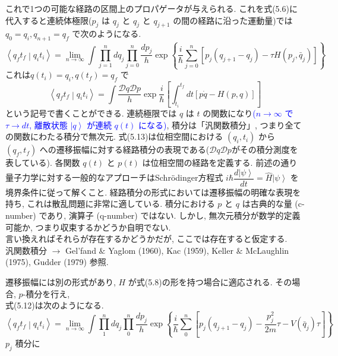 \documentclass{jsarticle}
\newcommand{\ket}[1]{\left|#1\right\rangle}
\newcommand{\braket}[2]{\left\langle #1\middle|#2\right\rangle}
\begin{document}
これで1つの可能な経路の区間上のプロパゲータが与えられる. これを式(5.6)に代入すると連続体極限($p_{j}$ は $q_{j}$ と $q_{j}$ と $q_{j+1}$ の間の経路に沿った運動量)では $q_{0} = q_{i}, q_{n+1} = q_{f}$ で次のようになる.
\begin{equation*}
    \braket{q_{f}t_{f}}{q_{i}t_{i}} = \lim_{n \rightarrow \infty} \int \prod_{j=1}^{n} dq_{j} \prod_{j=0}^{n}\frac{dp_{j}}{h}\exp\left\{ \frac{i}{\hbar}\sum_{j=0}^{n} [p_{j}(q_{j+1} - q_{j}) - \tau H(p_{j}, \bar{q}_{j})]\right\} \tag{5.12}
\end{equation*}
これは$q(t_i) = q_{i}, q(t_{f}) = q_{f}$ で
\begin{equation*}
    \braket{q_{f}t_{f}}{q_{i}t_{i}} = \int \frac{\mathcal{D}q\mathcal{D}p}{h}\exp\frac{i}{\hbar}\left[ \int_{t_{i}}^{t_{f}} dt [p\dot{q} - H(p, q)] \right] \tag{5.13}
\end{equation*}
という記号で書くことができる. 連続極限では $q$ は $t$ の関数になり\textcolor{blue}{($n \to \infty$ で $\tau \to dt$, 離散状態 $\ket{q}$ が連続 $q(t)$ になる)}, 積分は「汎関数積分」, つまり全ての関数にわたる積分で無次元. 式(5.13)は位相空間における $(q_{i}, t_{i})$ から $(q_{f}, t_{f})$ への遷移振幅に対する経路積分の表現である\color{blue}($\mathcal{D}q\mathcal{D}p$がその積分測度を表している)\color{black}. 各関数 $q(t)$ と $p(t)$ は位相空間の経路を定義する. 前述の通り量子力学に対する一般的なアプローチはSchr\"{o}dinger方程式 $i\hbar\dfrac{d\ket{\psi}}{dt} = \hat{H}\ket{\psi}$ を境界条件に従って解くこと. 経路積分の形式においては遷移振幅の明確な表現を持ち, これは散乱問題に非常に適している. 積分における $p$ と $q$ は古典的な量 (c-number) であり, 演算子 (q-number) ではない. しかし, 無次元積分が数学的定義可能か, つまり収束するかどうか自明でない.\\
言い換えればそれらが存在するかどうかだが, ここでは存在すると仮定する.\\
汎関数積分 $\rightarrow$ Gel'fand $\&$ Yaglom (1960), Kac (1959), Keller $\&$ McLaughlin (1975), Gudder (1979) 参照. \par
遷移振幅には別の形式があり, $H$ が式(5.8)の形を持つ場合に適応される. その場合, $p$-積分を行え,\\
式(5.12)は次のようになる.
\begin{equation*}
    \braket{q_{f}t_{f}}{q_{i}t_{i}} = \lim_{n \rightarrow \infty} \int \prod_{1}^{n}dq_{j}\prod_{0}^{n}\frac{dp_{j}}{h}\exp\left\{ \frac{i}{\hbar}\sum_{0}^{n}\left[ p_{j}(q_{j+1} - q_{j}) - \frac{p^{2}_{j}}{2m}\tau - V(\bar{q}_{j})\tau \right] \right\}
\end{equation*}
$p_{j}$ 積分に
\end{document}
